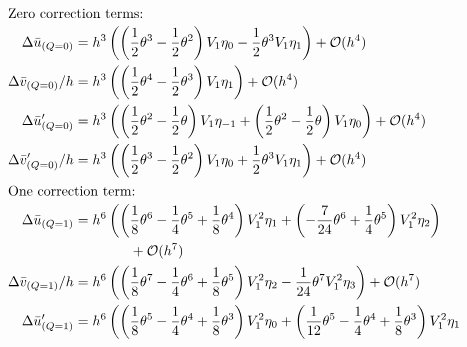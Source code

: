 \begingroup
\allowdisplaybreaks
\begin{align*}
    \intertext{Zero correction terms:}
    \Delta \bar{u}_{(Q=0)}    & = h^{3}\left(\left(\frac{1}{2} \theta^{3} - \frac{1}{2} \theta^{2}\right) V_{1} \eta_{0} -\frac{1}{2} \theta^{3} V_{1} \eta_{1}\right) + \mathcal{O}(h^{4})                                                                              \\
    \Delta \bar{v}_{(Q=0)}/h  & = h^{3}\left(\left(\frac{1}{2} \theta^{4} - \frac{1}{2} \theta^{3}\right) V_{1} \eta_{1}\right) + \mathcal{O}(h^{4})                                                                                                                     \\
    \Delta \bar{u}'_{(Q=0)}   & = h^{3}\left(\left(\frac{1}{2} \theta^{2} - \frac{1}{2} \theta\right) V_{1} \eta_{-1} + \left(\frac{1}{2} \theta^{2} - \frac{1}{2} \theta\right) V_{1} \eta_{0}\right) + \mathcal{O}(h^{4})                                              \\
    \Delta \bar{v}'_{(Q=0)}/h & = h^{3}\left(\left(\frac{1}{2} \theta^{3} - \frac{1}{2} \theta^{2}\right) V_{1} \eta_{0} + \frac{1}{2} \theta^{3} V_{1} \eta_{1}\right) + \mathcal{O}(h^{4})                                                                             \\
    \intertext{One correction term:}
    \Delta \bar{u}_{(Q=1)}    & = h^{6}\left(\left(\frac{1}{8} \theta^{6} - \frac{1}{4} \theta^{5} + \frac{1}{8} \theta^{4}\right) V_{1}^{2} \eta_{1} + \left(-\frac{7}{24} \theta^{6} + \frac{1}{4} \theta^{5}\right) V_{1}^{2} \eta_{2}\right)                         \\
                              & \qquad\qquad + \mathcal{O}(h^{7})                                                                                                                                                                                                        \\
    \Delta\bar{v}_{(Q=1)}/h   & = h^{6}\left(\left(\frac{1}{8} \theta^{7} - \frac{1}{4} \theta^{6} + \frac{1}{8} \theta^{5}\right) V_{1}^{2} \eta_{2} -\frac{1}{24} \theta^{7} V_{1}^{2} \eta_{3}\right) + \mathcal{O}(h^{7})                                            \\
    \Delta \bar{u}'_{(Q=1)}   & = h^{6}\left(\left(\frac{1}{8} \theta^{5} - \frac{1}{4} \theta^{4} + \frac{1}{8} \theta^{3}\right) V_{1}^{2} \eta_{0} + \left(\frac{1}{12} \theta^{5} - \frac{1}{4} \theta^{4} + \frac{1}{8} \theta^{3}\right) V_{1}^{2} \eta_{1}\right. \\

\end{align*}
